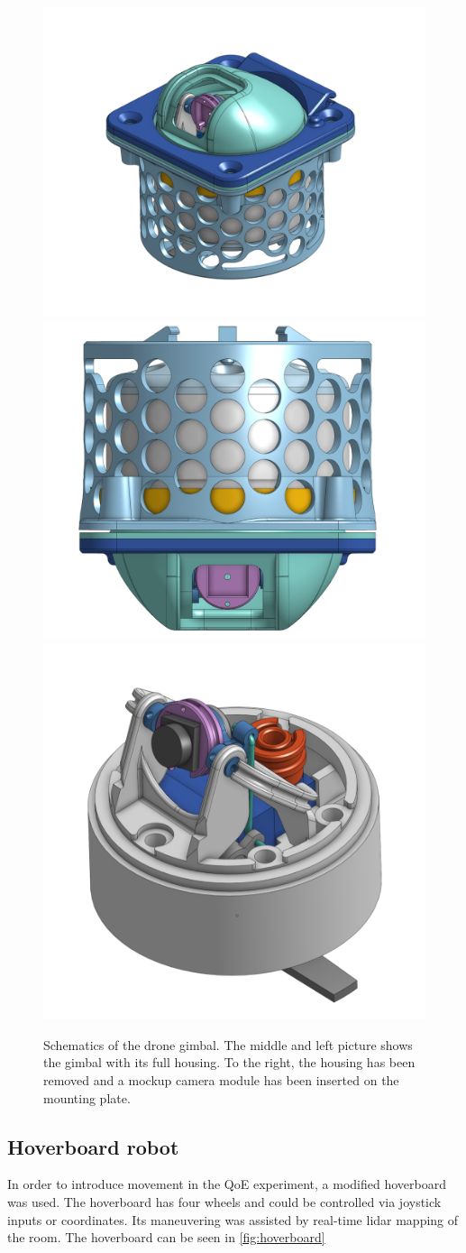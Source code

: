 \documentclass[nofilelist]{cslthse-msc}
\begin{document}
\begin{description}
   \begin{figure}[htp]
      \centering
      \includegraphics[width=.3\textwidth]{images/gimbal-1.png}\hfill
      \includegraphics[width=.3\textwidth]{images/gimbal-2.png}\hfill
      \includegraphics[width=.3\textwidth]{images/gimbal-3.png}
      \caption{Schematics of the drone gimbal. The middle and left picture shows the gimbal with its full housing. To the right, the housing has been removed and a mockup camera module has been inserted on the mounting plate.}
      \label{fig:gimbal-pics}
   \end{figure}
\end{description}
   
\subsection{Hoverboard robot}
In order to introduce movement in the QoE experiment, a modified hoverboard was used. The hoverboard has four wheels and could be controlled via joystick inputs or coordinates. Its maneuvering was assisted by real-time lidar mapping of the room. The hoverboard can be seen in \ref{fig:hoverboard}
\end{document}
